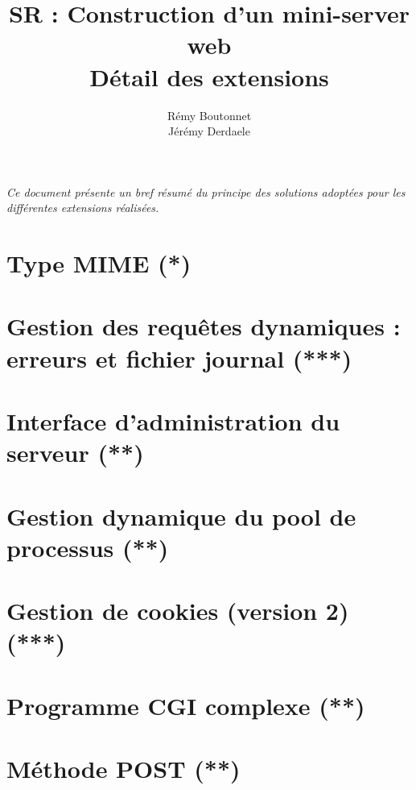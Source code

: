 \documentclass{article}
\title{\vspace*{\fill}SR : Construction d'un mini-server web\\Détail des extensions}
\author{Rémy Boutonnet\\Jérémy Derdaele}
\begin{document}
\maketitle

\vspace*{\fill}

\textit{
Ce document présente un bref résumé du principe des solutions adoptées pour les différentes extensions réalisées.
}

\newpage

\section{Type MIME (*)}

\section{Gestion des requêtes dynamiques : erreurs et fichier journal (***)}

\section{Interface d'administration du serveur (**)}

\section{Gestion dynamique du pool de processus (**)}

\section{Gestion de cookies (version 2) (***)}

\section{Programme CGI complexe (**)}

\section{Méthode POST (**)}
\end{document}
